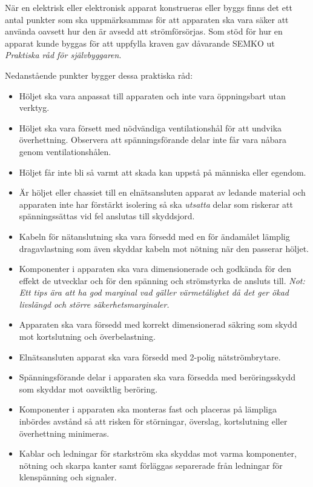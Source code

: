 När en elektrisk eller elektronisk apparat konstrueras eller byggs finns det
ett antal punkter som ska uppmärksammas för att apparaten ska vara säker att
använda oavsett hur den är avsedd att strömförsörjas.
Som stöd för hur en apparat kunde byggas för att uppfylla kraven gav
dåvarande SEMKO ut \emph{Praktiska råd för självbyggaren}.

Nedanstående punkter bygger dessa praktiska råd:

\begin{itemize}
	\item Höljet ska vara anpassat till apparaten och inte vara öppningsbart
	utan verktyg.
	\item Höljet ska vara försett med nödvändiga ventilationshål för att
	undvika överhettning. Observera att spänningsförande delar inte får
	vara nåbara genom ventilationshålen.
	\item Höljet får inte bli så varmt att skada kan uppstå på människa
	eller egendom.
	\item Är höljet eller chassiet till en elnätsansluten apparat av ledande
	material och apparaten inte har förstärkt isolering så ska \emph{utsatta}
	delar som riskerar att spänningssättas vid fel anslutas till skyddsjord.
	\item Kabeln för nätanslutning ska vara försedd med en för ändamålet
	lämplig dragavlastning som även skyddar kabeln mot nötning när den
	passerar höljet.
	\item Komponenter i apparaten ska vara dimensionerade och godkända
	för den effekt de utvecklar och för den spänning och strömstyrka de
	ansluts till. \emph{Not: Ett tips ära att ha god marginal vad gäller
	värmetålighet då det ger ökad livslängd och större säkerhetsmarginaler.}
	\item Apparaten ska vara försedd med korrekt dimensionerad säkring
	som skydd mot kortslutning och överbelastning.
	\item Elnätsansluten apparat ska vara försedd med 2-polig nätströmbrytare.
	\item Spänningsförande delar i apparaten ska vara försedda med
	beröringsskydd som skyddar mot oavsiktlig beröring.
	\item Komponenter i apparaten ska monteras fast och placeras på lämpliga
	inbördes avstånd så att risken för störningar, överslag, kortslutning eller
	överhettning minimeras.
	\item Kablar och ledningar för starkström ska skyddas mot varma komponenter,
	nötning och skarpa kanter samt förläggas separerade från ledningar för
	klenspänning och signaler.
\end{itemize}

